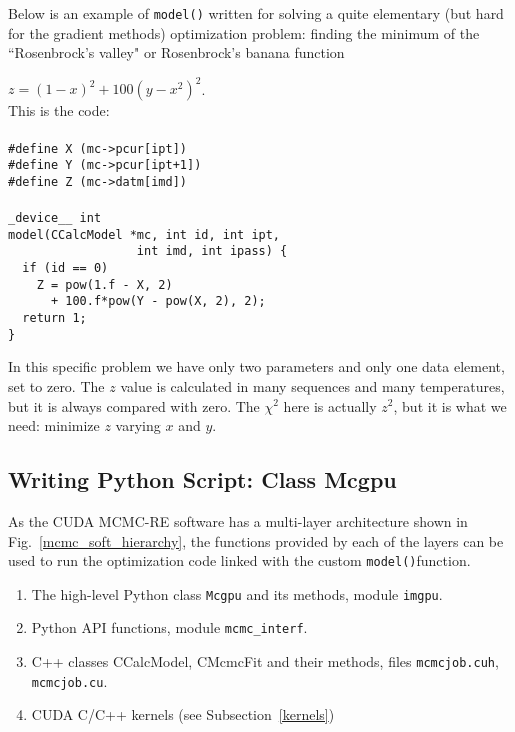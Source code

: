 \documentclass[preprint2]{aastex}
\begin{document}
Below is an example of \verb|model()| written for solving a quite elementary (but hard for the gradient methods) optimization problem: finding the minimum of the ``Rosenbrock's valley" or Rosenbrock's banana function 

$z = (1 - x)^2 + 100(y - x^2)^2$. \\

This is the code: \\ \\
\verb|#define X (mc->pcur[ipt])| \\
\verb|#define Y (mc->pcur[ipt+1])| \\
\verb|#define Z (mc->datm[imd])| \\\\
\verb|_device__ int| \\
\verb|model(CCalcModel *mc, int id, int ipt, | \\
\verb|                  int imd, int ipass) {| \\
\verb|  if (id == 0)| \\
\verb|    Z = pow(1.f - X, 2)| \\
\verb|      + 100.f*pow(Y - pow(X, 2), 2);| \\
\verb|  return 1;|\\
\verb|}|

In this specific problem we have only two parameters and only one data element, set to zero. The $z$ value is calculated in many sequences and many temperatures, but it is always compared with zero. The $\chi^2$ here is actually $z^2$, but it is what we need: minimize $z$ varying $x$ and $y$. 

\subsection{Writing Python Script: Class Mcgpu}\label{mcgpu}

As the CUDA MCMC-RE software has a multi-layer architecture shown in Fig.~\ref{mcmc_soft_hierarchy}, 
the functions provided by each of the layers can be used to run the optimization code linked with the 
custom \verb|model()|function. 

\begin{enumerate}
  \item The high-level Python class \verb|Mcgpu| and its methods, module \verb|imgpu|.
  \item Python API functions, module \verb|mcmc_interf|.
  \item C++ classes CCalcModel, CMcmcFit and their methods, files \verb|mcmcjob.cuh|, \verb|mcmcjob.cu|.
  \item CUDA C/C++ kernels (see Subsection~\ref{kernels})
\end{enumerate}
\end{document}
